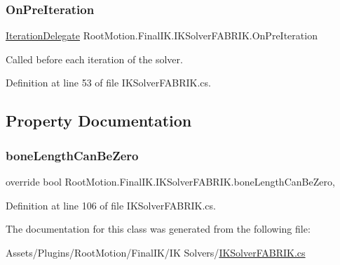 \subsubsection{\texorpdfstring{On\+Pre\+Iteration}{OnPreIteration}}
{\footnotesize\ttfamily \mbox{\hyperlink{class_root_motion_1_1_final_i_k_1_1_i_k_solver_ae3da6a8ccd8224ce56d15c4da5cd1ef7}{Iteration\+Delegate}} Root\+Motion.\+Final\+I\+K.\+I\+K\+Solver\+F\+A\+B\+R\+I\+K.\+On\+Pre\+Iteration}



Called before each iteration of the solver. 



Definition at line 53 of file I\+K\+Solver\+F\+A\+B\+R\+I\+K.\+cs.



\subsection{Property Documentation}
\mbox{\label{class_root_motion_1_1_final_i_k_1_1_i_k_solver_f_a_b_r_i_k_a93177275f835e30c05ca8873d91e727d}} 
\subsubsection{\texorpdfstring{bone\+Length\+Can\+Be\+Zero}{boneLengthCanBeZero}}
{\footnotesize\ttfamily override bool Root\+Motion.\+Final\+I\+K.\+I\+K\+Solver\+F\+A\+B\+R\+I\+K.\+bone\+Length\+Can\+Be\+Zero\hspace{0.3cm}{\ttfamily [get]}, {\ttfamily [protected]}}



Definition at line 106 of file I\+K\+Solver\+F\+A\+B\+R\+I\+K.\+cs.



The documentation for this class was generated from the following file\+:\begin{DoxyCompactItemize}
\item 
Assets/\+Plugins/\+Root\+Motion/\+Final\+I\+K/\+I\+K Solvers/\mbox{\hyperlink{_i_k_solver_f_a_b_r_i_k_8cs}{I\+K\+Solver\+F\+A\+B\+R\+I\+K.\+cs}}\end{DoxyCompactItemize}
